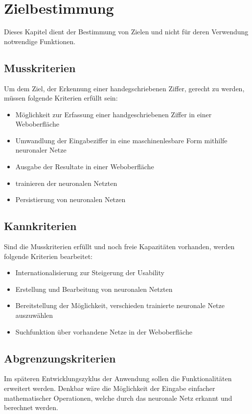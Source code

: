 \section{Zielbestimmung}
Dieses Kapitel dient der Bestimmung von Zielen und nicht für deren Verwendung
notwendige Funktionen.
 
\subsection{Musskriterien}

Um dem Ziel, der Erkennung einer handegschriebenen Ziffer, gerecht zu werden, müssen 
folgende Kriterien erfüllt sein:

\begin{itemize}
\item Möglichkeit zur Erfassung einer handgeschriebenen Ziffer in einer Weboberfläche
\item Umwandlung der Eingabeziffer in eine maschinenlesbare Form mithilfe neuronaler Netze
\item Ausgabe der Resultate in einer Weboberfläche
\item trainieren der neuronalen Netzten
\item Persistierung von neuronalen Netzen
\end{itemize}
 
\subsection{Kannkriterien}

Sind die Musskriterien erfüllt und noch freie Kapazitäten vorhanden, werden folgende Kriterien bearbeitet:

\begin{itemize}
\item Internationalisierung zur Steigerung der Usability
\item Erstellung und Bearbeitung von neuronalen Netzten
\item Bereitstellung der Möglichkeit, verschieden trainierte neuronale Netze auszuwählen
\item Suchfunktion über vorhandene Netze in der Weboberfläche
\end{itemize}

 
\subsection{Abgrenzungskriterien}
Im späteren Entwicklungszyklus der Anwendung sollen die Funktionalitäten erweitert werden. Denkbar wäre die Möglichkeit
der Eingabe einfacher mathematischer Operationen, welche durch das neuronale Netz erkannt und berechnet werden.
